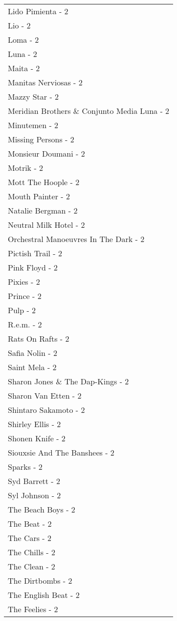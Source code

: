 \documentclass[
]{article}
\begin{document}
\begin{longtable}{l}
Lido Pimienta - 2 \\ 
Lio - 2 \\ 
Loma - 2 \\ 
Luna - 2 \\ 
Maita - 2 \\ 
Manitas Nerviosas - 2 \\ 
Mazzy Star - 2 \\ 
Meridian Brothers \& Conjunto Media Luna - 2 \\ 
Minutemen - 2 \\ 
Missing Persons - 2 \\ 
Monsieur Doumani - 2 \\ 
Motrik - 2 \\ 
Mott The Hoople - 2 \\ 
Mouth Painter - 2 \\ 
Natalie Bergman - 2 \\ 
Neutral Milk Hotel - 2 \\ 
Orchestral Manoeuvres In The Dark - 2 \\ 
Pictish Trail - 2 \\ 
Pink Floyd - 2 \\ 
Pixies - 2 \\ 
Prince - 2 \\ 
Pulp - 2 \\ 
R.e.m. - 2 \\ 
Rats On Rafts - 2 \\ 
Safia Nolin - 2 \\ 
Saint Mela - 2 \\ 
Sharon Jones \& The Dap-Kings - 2 \\ 
Sharon Van Etten - 2 \\ 
Shintaro Sakamoto - 2 \\ 
Shirley Ellis - 2 \\ 
Shonen Knife - 2 \\ 
Siouxsie And The Banshees - 2 \\ 
Sparks - 2 \\ 
Syd Barrett - 2 \\ 
Syl Johnson - 2 \\ 
The Beach Boys - 2 \\ 
The Beat - 2 \\ 
The Cars - 2 \\ 
The Chills - 2 \\ 
The Clean - 2 \\ 
The Dirtbombs - 2 \\ 
The English Beat - 2 \\ 
The Feelies - 2 \\ 

\end{longtable}
\end{document}
